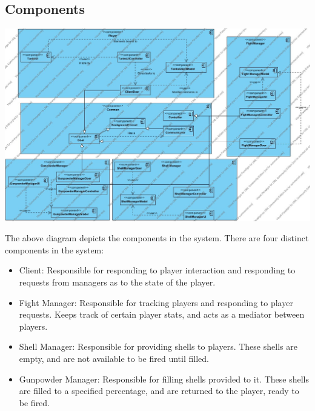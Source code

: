 \documentclass[12pt]{article}
\begin{document}
		\subsection{Components}
			\begin{center}
				\includegraphics[width=\textwidth]{Diagrams/Structure Diagrams/ComponentDiagram.jpg}
			\end{center}
			\indent The above diagram depicts the components in the system. There are four distinct components in the system:
			\begin{itemize}
				\item{Client: Responsible for responding to player interaction and responding to requests from managers as to the state of the player.}
				\item{Fight Manager: Responsible for tracking players and responding to player requests. Keeps track of certain player stats, and acts as a mediator between players.}
				\item{Shell Manager: Responsible for providing shells to players. These shells are empty, and are not available to be fired until filled.}
				\item{Gunpowder Manager: Responsible for filling shells provided to it. These shells are filled to a specified percentage, and are returned to the player, ready to be fired.}
			\end{itemize} 
\end{document}
